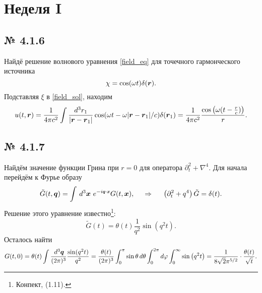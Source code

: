 \section{Неделя I}

\subsection*{№ 4.1.6}

Найдё решение волнового уравнения \eqref{field_eq} для точечного гармонческого источника
\begin{equation*}
    \chi = \cos(\omega t) \delta(\mbox{\boldmath $r$}).
\end{equation*}
Подставляя $\xi$ в \eqref{field_sol}, находим
\begin{equation*}
    u(t, \mbox{\boldmath $r$}) = \frac{1}{4 \pi c^2} \int \frac{d^3 r_1}{|\mbox{\boldmath $r$} - \mbox{\boldmath $r$}_1|} \cos(\omega t - \omega |\mbox{\boldmath $r$} - \mbox{\boldmath $r$}_1|/c) \delta(\mbox{\boldmath $r$}_1) = 
    \frac{1}{4 \pi c^2} \frac{\cos\left(\omega (t - \frac{r}{c})\right)}{r} .
\end{equation*}




\subsection*{№ 4.1.7}

Найдём значение функции Грина при $r=0$ для оператора $\partial_t^2 + \nabla^4$. Для начала перейдём к Фурье образу
\begin{equation*}
    \tilde{G}(t, \vc{q}) = \int \d^3 \vc{x} \ e^{-i \smallvc{q} \cdot \smallvc{x}} G(t, \vc{x}),
    \hspace{0.5cm} \Rightarrow \hspace{0.5cm}
    \left(\partial_t^2 + q^4\right) \tilde{G} = \delta(t).
\end{equation*}
Решение этого уравнение известно\footnote{
    Конпект, (1.11).
}:
\begin{equation*}
    \tilde{G}(t) = \theta(t) \frac{1}{q^2} \sin\left(q^2 t\right).
\end{equation*}
Осталось найти 
\begin{equation*}
    G(t, 0) = \theta(t) \int \frac{\, d^3 \mbox{\boldmath $q$}}{(2 \pi)^3} \frac{\sin( q^2 t)}{q^2} = \frac{\theta(t)}{(2\pi)^3}
    \int_{0}^{\pi} \sin \theta \, d \theta \int_{0}^{2\pi} d \varphi \int_{0}^{\infty} \sin\left(q^2 t\right) = \frac{1}{8 \sqrt{2} \pi ^{5/2}} \cdot \frac{\theta(t) }{\sqrt{t}}.
\end{equation*}

